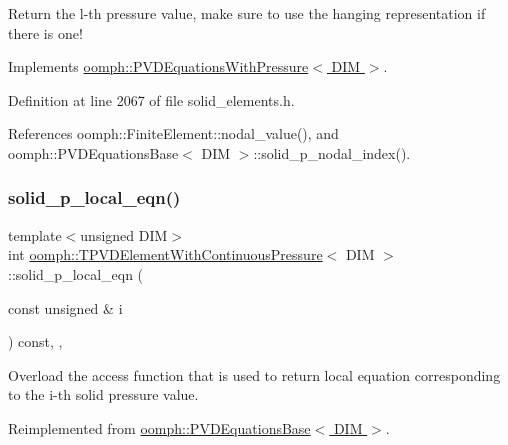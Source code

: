 Return the l-\/th pressure value, make sure to use the hanging representation if there is one! 

Implements \hyperlink{classoomph_1_1PVDEquationsWithPressure_a2f447e84104fbdd8afe9efe52c62f2b3}{oomph\+::\+P\+V\+D\+Equations\+With\+Pressure$<$ D\+I\+M $>$}.



Definition at line 2067 of file solid\+\_\+elements.\+h.



References oomph\+::\+Finite\+Element\+::nodal\+\_\+value(), and oomph\+::\+P\+V\+D\+Equations\+Base$<$ D\+I\+M $>$\+::solid\+\_\+p\+\_\+nodal\+\_\+index().

\mbox{\label{classoomph_1_1TPVDElementWithContinuousPressure_a0a299931244a8cc58f90050f38201919}} 
\subsubsection{\texorpdfstring{solid\+\_\+p\+\_\+local\+\_\+eqn()}{solid\_p\_local\_eqn()}}
{\footnotesize\ttfamily template$<$unsigned D\+IM$>$ \\
int \hyperlink{classoomph_1_1TPVDElementWithContinuousPressure}{oomph\+::\+T\+P\+V\+D\+Element\+With\+Continuous\+Pressure}$<$ D\+IM $>$\+::solid\+\_\+p\+\_\+local\+\_\+eqn (\begin{DoxyParamCaption}\item[{const unsigned \&}]{i }\end{DoxyParamCaption}) const\hspace{0.3cm}{\ttfamily [inline]}, {\ttfamily [protected]}, {\ttfamily [virtual]}}



Overload the access function that is used to return local equation corresponding to the i-\/th solid pressure value. 



Reimplemented from \hyperlink{classoomph_1_1PVDEquationsBase_a30d30a7dd711c84a175bf820ea56e3ef}{oomph\+::\+P\+V\+D\+Equations\+Base$<$ D\+I\+M $>$}.




